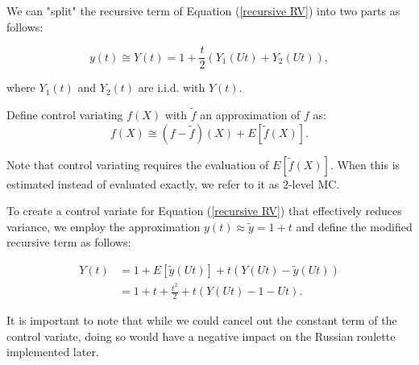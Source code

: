 \documentclass[a4paper,12pt]{article}
\begin{document}
\begin{example} \label{ex:splitting}
    We can "split" the recursive term of Equation (\ref{recursive RV})
    into two parts as follows:

    \begin{equation}
        y(t) \cong Y(t) = 1 + \frac{t}{2}(Y_{1}(Ut) + Y_{2}(Ut)),
    \end{equation}

    where $Y_{1}(t)$ and $Y_{2}(t)$ are i.i.d. with $Y(t)$.
\end{example}

\vspace{0.2cm}

\begin{pythonn}
\end{pythonn}

\begin{definition} \label{CV}
    Define control variating $f(X)$ with $\tilde{f}$ an approximation of $f$ as:
    \begin{equation}
        f(X) \cong (f-\tilde{f})(X) + E[\tilde{f}(X)].
    \end{equation}

    Note that control variating requires the evaluation of
    $E[\tilde{f}(X)]$. When this is estimated instead of evaluated
    exactly, we refer to it as $2$-level MC.
\end{definition}


\begin{example} \label{ex:CV}
    To create a control variate for Equation (\ref{recursive RV}) that
    effectively reduces variance, we employ the approximation
    $y(t) \approx \tilde{y} =1+t$ and define the modified recursive term as follows:

    \begin{align}
        Y(t) & = 1 + E[\tilde{y}(Ut)] + t(Y(Ut) - \tilde{y}(Ut)) \\
             & = 1 + t + \frac{t^2}{2} + t(Y(Ut) - 1 - Ut).
    \end{align}

    It is important to note that while we could cancel out the constant term
    of the control variate, doing so would have a negative impact on
    the Russian roulette implemented later.
\end{example}

\vspace*{0.2cm}
\begin{pythonn}
\end{pythonn}
\end{document}
